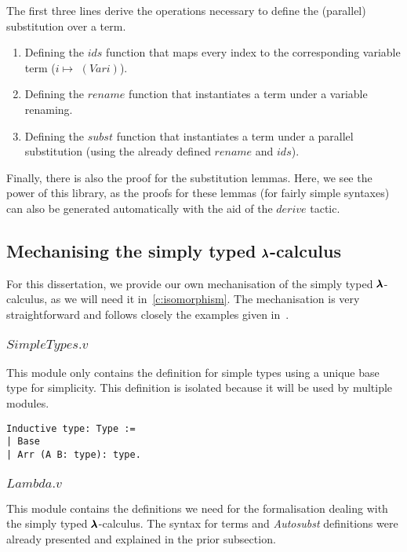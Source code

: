 The first three lines derive the operations necessary to define the (parallel) substitution over a term.
\begin{enumerate}
\item Defining the \lst$ids$ function that maps every index to the corresponding variable term ($i \mapsto $ \lst$(Var i)$).
\item Defining the \lst$rename$ function that instantiates a term under a variable renaming.
\item Defining the \lst$subst$ function that instantiates a term under a parallel substitution (using the already defined \lst$rename$ and \lst$ids$).
\end{enumerate}

Finally, there is also the proof for the substitution lemmas.
Here, we see the power of this library, as the proofs for these lemmas (for fairly simple syntaxes) can also be generated automatically with the aid of the \lst$derive$ tactic. 


\subsection{Mechanising the simply typed $\pmb{\lambda}$-calculus}

For this dissertation, we provide our own mechanisation of the simply typed $\pmb{\lambda}$-calculus, as we will need it in~\cref{c:isomorphism}.
The mechanisation is very straightforward and follows closely the examples given in~\cite{AutosubstManual,AutosubstSchafer}.

\subsubsection{\lst$SimpleTypes.v$}

This module only contains the definition for simple types using a unique base type for simplicity.
This definition is isolated because it will be used by multiple modules.
\begin{lstlisting}[language=Coq]
Inductive type: Type :=
| Base
| Arr (A B: type): type.
\end{lstlisting}

\subsubsection{\lst$Lambda.v$}

This module contains the definitions we need for the formalisation dealing with the simply typed $\pmb{\lambda}$-calculus.
The syntax for terms and \textit{Autosubst} definitions were already presented and explained in the prior subsection.

